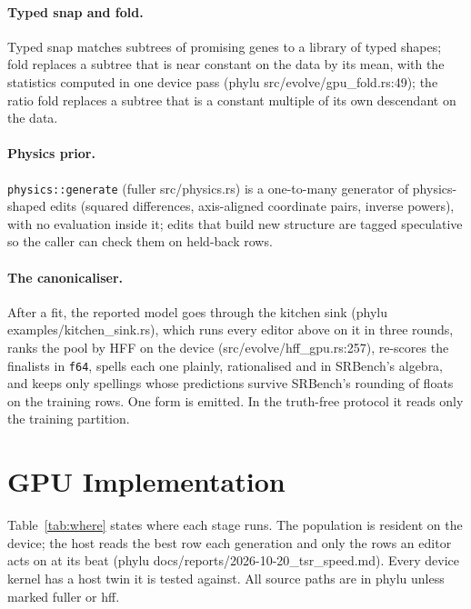 \documentclass[sigconf,nonacm]{acmart}
\newcommand{\src}[1]{{\small\ttfamily #1}}
\begin{document}
\paragraph{Typed snap and fold.} Typed snap matches subtrees of promising genes
to a library of typed shapes; fold replaces a subtree that is near constant on
the data by its mean, with the statistics computed in one device pass
(\src{phylu src/\allowbreak{}evolve/\allowbreak{}gpu\_\allowbreak{}fold.\allowbreak{}rs:49}); the ratio fold replaces a subtree that
is a constant multiple of its own descendant on the data.

\paragraph{Physics prior.} \texttt{physics::generate} (\src{fuller
src/\allowbreak{}physics.\allowbreak{}rs}) is a one-to-many generator of physics-shaped edits (squared
differences, axis-aligned coordinate pairs, inverse powers), with no evaluation
inside it; edits that build new structure are tagged speculative so the caller
can check them on held-back rows.

\paragraph{The canonicaliser.} After a fit, the reported model goes through the
kitchen sink (\src{phylu examples/\allowbreak{}kitchen\_\allowbreak{}sink.\allowbreak{}rs}), which runs every editor
above on it in three rounds, ranks the pool by HFF on the device
(\src{src/\allowbreak{}evolve/\allowbreak{}hff\_\allowbreak{}gpu.\allowbreak{}rs:257}), re-scores the finalists in \texttt{f64},
spells each one plainly, rationalised and in SRBench's algebra, and keeps only
spellings whose predictions survive SRBench's rounding of floats on the
training rows. One form is emitted. In the truth-free protocol it reads only the
training partition.

\section{GPU Implementation}
\label{sec:gpu}

Table~\ref{tab:where} states where each stage runs. The population is resident
on the device; the host reads the best row each generation and only the rows an
editor acts on at its beat (\src{phylu docs/\allowbreak{}reports/\allowbreak{}2026-10-20\_\allowbreak{}tsr\_\allowbreak{}speed.\allowbreak{}md}).
Every device kernel has a host twin it is tested against. All source paths are
in phylu unless marked fuller or hff.
\end{document}
